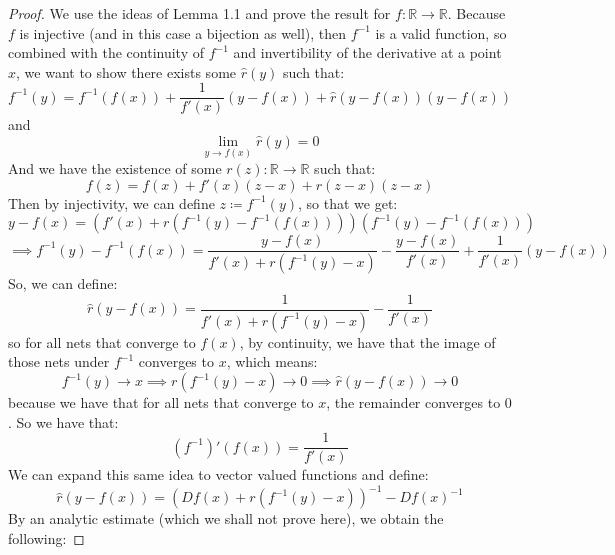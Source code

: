 \documentclass[10pt,letterpaper]{article} %
\begin{document}
\begin{proof}
We use the ideas of Lemma 1.1 and prove the result for $f: \mathbb{R} \xrightarrow{} \mathbb{R}$. Because $f$ is injective (and in this case a bijection as well), then $f^{-1}$ is a valid function, so combined with the continuity of $f^{-1}$ and invertibility of the derivative at a point $x$, we want to show there exists some $\hat{r}(y)$ such that:
\begin{equation*}
f^{-1}(y) = f^{-1}(f(x)) + \frac{1}{f'(x)}(y - f(x)) + \hat{r}(y - f(x))(y - f(x))
\end{equation*}
and
\begin{equation*}
\lim_{y \xrightarrow{} f(x)}\hat{r}(y) = 0
\end{equation*}
And we have the existence of some $r(z): \mathbb{R} \xrightarrow{} \mathbb{R}$ such that:
\begin{equation*}
f(z) = f(x) + f'(x)(z-x) + r(z-x)(z-x)
\end{equation*}
Then by injectivity, we can define $z \coloneq f^{-1}(y)$, so that we get:
\begin{equation*}
y - f(x) = (f'(x) + r(f^{-1}(y) - f^{-1}(f(x))))(f^{-1}(y) - f^{-1}(f(x)))
\end{equation*}
\begin{equation*}
\implies f^{-1}(y) - f^{-1}(f(x)) = \frac{y - f(x)}{f'(x) + r(f^{-1}(y) - x)} - \frac{y - f(x)}{f'(x)} + \frac{1}{f'(x)}(y - f(x))
\end{equation*}
So, we can define:
\begin{equation*}
\hat{r}(y - f(x)) = \frac{1}{f'(x) + r(f^{-1}(y) - x)} - \frac{1}{f'(x)}
\end{equation*}
so for all nets that converge to $f(x)$, by continuity, we have that the image of those nets under $f^{-1}$ converges to $x$, which means:
\begin{equation*}
f^{-1}(y) \xrightarrow{} x \implies r(f^{-1}(y) - x) \xrightarrow{} 0 \implies \hat{r}(y - f(x)) \xrightarrow{} 0
\end{equation*}
because we have that for all nets that converge to $x$, the remainder converges to $0$. So we have that:
\begin{equation*}
(f^{-1})'(f(x)) = \frac{1}{f'(x)}
\end{equation*}
We can expand this same idea to vector valued functions and define:
\begin{equation*}
\hat{r}(y - f(x)) = (Df(x) + r(f^{-1}(y) - x))^{-1} - Df(x)^{-1}
\end{equation*}
By an analytic estimate (which we shall not prove here), we obtain the following:

\end{proof}
\end{document}
